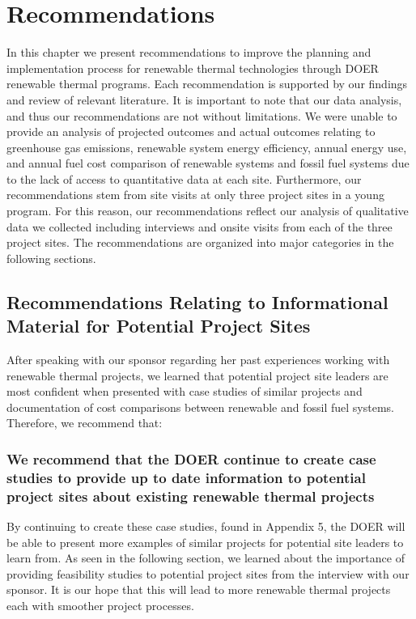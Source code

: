
\chapter{Recommendations}
\par In this chapter we present recommendations to improve the planning and implementation process for renewable thermal technologies through DOER renewable thermal programs. Each recommendation is supported by our findings and review of relevant literature. It is important to note that our data analysis, and thus our recommendations are not without limitations. We were unable to provide an analysis of projected outcomes and actual outcomes relating to greenhouse gas emissions, renewable system energy efficiency, annual energy use, and annual fuel cost comparison of renewable systems and fossil fuel systems due to the lack of access to quantitative data at each site. Furthermore, our recommendations stem from site visits at only three project sites in a young program. For this reason, our recommendations reflect our analysis of qualitative data we collected including interviews and onsite visits from each of the three project sites. The recommendations are organized into major categories in the following sections.

\section{Recommendations Relating to Informational Material for Potential Project Sites}
\par After speaking with our sponsor regarding her past experiences working with renewable thermal projects, we learned that potential project site leaders are most confident when presented with case studies of similar projects and documentation of cost comparisons between renewable and fossil fuel systems. Therefore, we recommend that:
\subsection{We recommend that the DOER continue to create case studies to provide up to date information to potential project sites about existing renewable thermal projects}  
\par By continuing to create these case studies, found in Appendix 5, the DOER will be able to present more examples of similar projects for potential site leaders to learn from. As seen in the following section, we learned about the importance of providing feasibility studies to potential project sites from the interview with our sponsor. It is our hope that this will lead to more renewable thermal projects each with smoother project processes.

